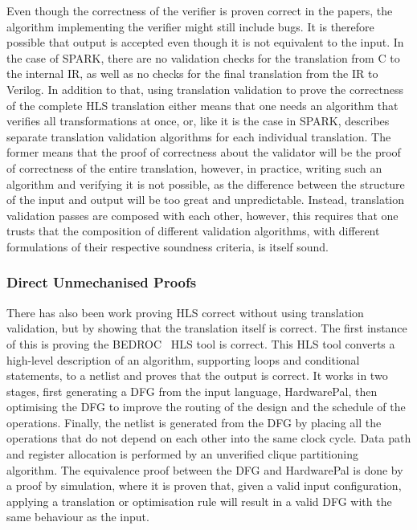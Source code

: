 Even though the correctness of the verifier is proven correct in the papers, the
algorithm implementing the verifier might still include bugs.  It is therefore
possible that output is accepted even though it is not equivalent to the input.
In the case of SPARK, there are no validation checks for the translation from C
to the internal \gls{IR}, as well as no checks for the final translation from
the \gls{IR} to Verilog.  In addition to that, using translation validation to
prove the correctness of the complete \gls{HLS} translation either means that
one needs an algorithm that verifies all transformations at once, or, like it is
the case in SPARK, describes separate translation validation algorithms for each
individual translation.  The former means that the proof of correctness about
the validator will be the proof of correctness of the entire translation,
however, in practice, writing such an algorithm and verifying it is not
possible, as the difference between the structure of the input and output will
be too great and unpredictable.  Instead, translation validation passes are
composed with each other, however, this requires that one trusts that the
composition of different validation algorithms, with different formulations of
their respective soundness criteria, is itself sound.

\subsubsection{Direct Unmechanised Proofs}

There has also been work proving \gls{HLS} correct without using translation
validation, but by showing that the translation itself is correct.  The first
instance of this is proving the BEDROC~\cite{chapman92_verif_bedroc} HLS tool is
correct.  This HLS tool converts a high-level description of an algorithm,
supporting loops and conditional statements, to a netlist and proves that the
output is correct.  It works in two stages, first generating a \gls{DFG} from
the input language, HardwarePal, then optimising the \gls{DFG} to improve the
routing of the design and the schedule of the operations.  Finally, the netlist
is generated from the \gls{DFG} by placing all the operations that do not depend
on each other into the same clock cycle.  Data path and register allocation is
performed by an unverified clique partitioning algorithm.  The equivalence proof
between the \gls{DFG} and HardwarePal is done by a proof by simulation, where it
is proven that, given a valid input configuration, applying a translation or
optimisation rule will result in a valid \gls{DFG} with the same behaviour as
the input.

